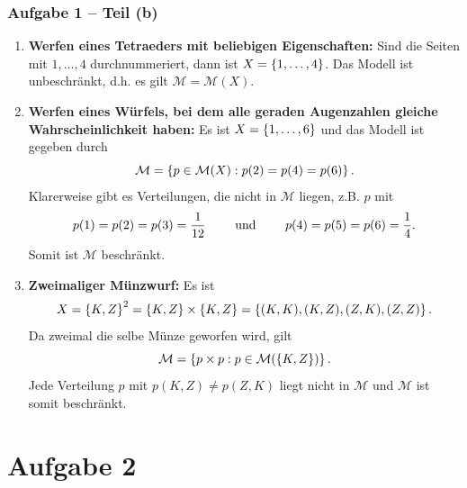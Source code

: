 \documentclass{beamer}
\begin{document}
\begin{frame} \frametitle{Aufgabe 1 -- Teil (b)}
	\justifying\scriptsize
	\begin{enumerate}[1.]
		\item \textbf{Werfen eines Tetraeders mit beliebigen Eigenschaften:}
		Sind die Seiten mit $1, \dots, 4$ durchnummeriert, dann ist $X = \left\{ 1, \dots, 4 \right\}$. Das Modell ist unbeschränkt, d.h. es gilt $\mathcal{M} = \mathcal{M}(X)$.
		\item \textbf{Werfen eines Würfels, bei dem alle geraden Augenzahlen gleiche Wahrscheinlichkeit haben:}
		Es ist $X = \left\{ 1, \dots, 6 \right\}$ und das Modell ist gegeben durch
		\begin{equation*}
			\mathcal{M} = \left\{ p \in \mathcal{M}(X) : p(2) = p(4) = p(6) \right\}.
		\end{equation*}
		Klarerweise gibt es Verteilungen, die nicht in $\mathcal{M}$ liegen, z.B. $p$ mit 
		\begin{equation*}
			p(1) = p(2) = p(3) = \frac{1}{12} \qquad \text{ und } \qquad p(4) = p(5) = p(6) = \frac{1}{4}.
		\end{equation*}
		Somit ist $\mathcal{M}$ beschränkt.
		\item \textbf{Zweimaliger Münzwurf:} Es ist
		\begin{equation*}
			X = \left\{ K,Z \right\}^2 = \left\{ K,Z \right\} \times \left\{ K, Z \right\} = \left\{ (K,K), (K,Z), (Z,K), (Z,Z) \right\}.
		\end{equation*}
		Da zweimal die selbe Münze geworfen wird, gilt
		\begin{equation*}
			\mathcal{M} = \left\{ p \times p : p \in \mathcal{M}(\left\{ K, Z \right\}) \right\}.
		\end{equation*}
		Jede Verteilung $p$ mit $p(K,Z) \neq p(Z,K)$ liegt nicht in $\mathcal{M}$ und $\mathcal{M}$ ist somit beschränkt.
	\end{enumerate}
\end{frame}

\section{Aufgabe 2}
\end{document}
